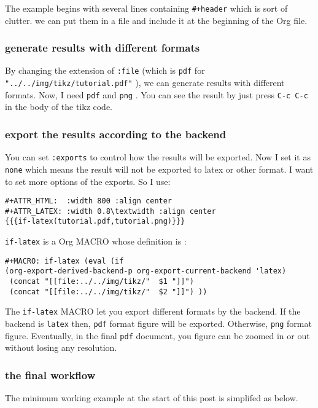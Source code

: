 \documentclass[koma,a4paper,captions=tableheading,11pt,listings-sv,microtype,paralist,colorlinks=true,urlcolor=blue,palatino]{org-article}
\begin{document}
The example begins with several lines containing \texttt{\#+header} which is sort of
clutter. we can put them in a file and include it at the beginning of the Org
file.
\subsubsection{generate results with different formats}
\label{sec:orgac277d3}


By changing the extension of \texttt{:file} (which is \texttt{pdf} for
\texttt{"../../img/tikz/tutorial.pdf"} ), we can generate results with different formats.
Now, I need \texttt{pdf} and \texttt{png} . You can see the result by just press \texttt{C-c C-c} in the
body of the tikz code.
\subsubsection{export the results according to the backend}
\label{sec:org864fe62}


You can set \texttt{:exports} to control how the results will be exported. Now I set it
as \texttt{none} which means the result will not be exported to latex or other format. I
want to set more options of the exports. So I use:

\begin{verbatim}
#+ATTR_HTML:  :width 800 :align center
#+ATTR_LATEX: :width 0.8\textwidth :align center
{{{if-latex(tutorial.pdf,tutorial.png)}}}
\end{verbatim}

\texttt{if-latex} is a Org MACRO whose definition is :
\begin{verbatim}
#+MACRO: if-latex (eval (if
(org-export-derived-backend-p org-export-current-backend 'latex)
 (concat "[[file:../../img/tikz/"  $1 "]]")
 (concat "[[file:../../img/tikz/"  $2 "]]") ))
\end{verbatim}

The \texttt{if-latex} MACRO let you export different formats by the backend. If the
backend is \texttt{latex} then, \texttt{pdf} format figure will be exported. Otherwise, \texttt{png} format
figure. Eventually, in the final \texttt{pdf} document, you figure can be zoomed in or
out without losing any resolution.

\subsubsection{the final workflow}
\label{sec:orgc26c788}


The minimum working example at the start of this post is simplifed as below.
\end{document}
